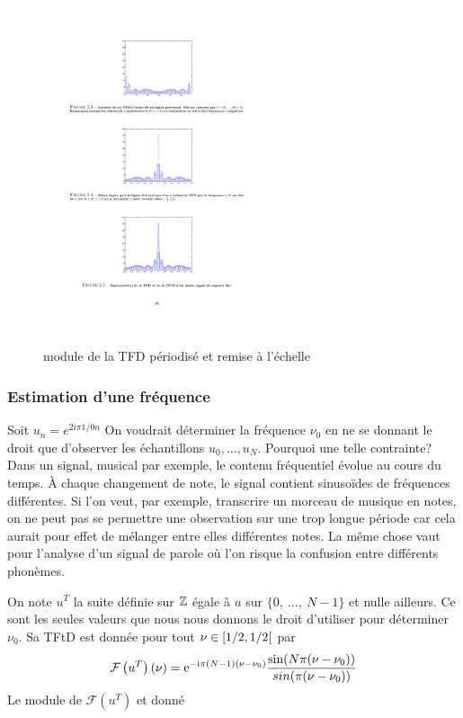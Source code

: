 \begin{figure}
  \centering
  \includegraphics[width=0.6\textwidth]{Figures/Figure2-4}\\
  \caption{module de la TFD p\'eriodis\'e et remise \`a l'\'echelle}\label{fig:figure2-4}
\end{figure}

\subsubsection{Estimation d'une fr\'equence}
Soit $u_{n}=e^{2i\pi 1/0n}$ On voudrait d\'{e}terminer la fr\'{e}quence $\nu_{0}$ en ne se donnant le droit que d'observer les \'{e}chantillons $u_{0}, \ldots, u_{N}$. Pourquoi une telle contrainte? Dans un signal, musical par exemple, le contenu fr\'{e}quentiel \'{e}volue au cours du temps. \`{A} chaque changement de note, le signal contient sinusoïdes de fr\'{e}quences diff\'{e}rentes. Si l'on veut, par exemple, transcrire un morceau de musique en notes, on ne peut pas se permettre une observation sur une trop longue p\'{e}riode car cela aurait pour effet de m\'{e}langer entre elles diff\'{e}rentes notes. La m\^{e}me chose vaut pour l'analyse d'un signal de parole o\`{u} l'on risque la confusion entre diff\'{e}rents phon\`{e}mes.

On note $u^{T}$ la suite d\'{e}finie sur $\mathbb{Z}$ \'{e}gale \`{a} $u$ sur $\{0,\ \ldots,\ N-1\}$ et nulle ailleurs. Ce sont les seules valeurs que nous nous donnons le droit d'utiliser pour d\'{e}terminer $\nu_{0}$. Sa TFtD est donnée pour tout
$\nu\in \left[1/2,1/2\right[$ par
$$
\mathcal{F}\left( u^{T} \right)(\nu)=\mathrm{e}^{-\mathrm{i} \pi (N-1)(\nu- \nu_0)} \frac{\sin(N\pi(\nu-\nu_{0}))}{sin(\pi(\nu-\nu_{0}))}
$$
Le module de $\mathcal{F}(u^{T})$ et donn\'{e} 

